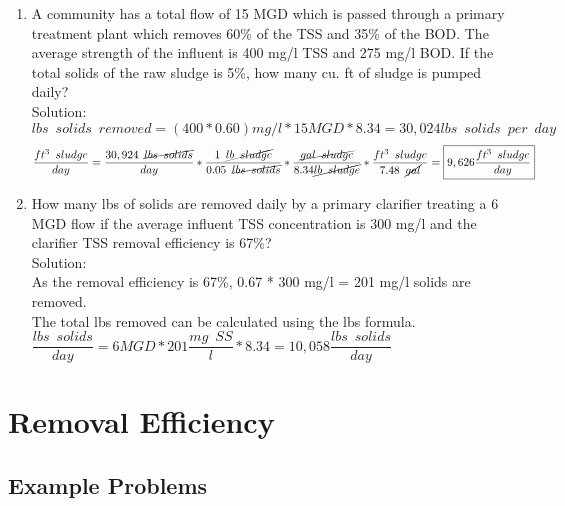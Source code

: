 \documentclass{article}
\begin{document}
\begin{enumerate}

\item A community has a total flow of 15 MGD which is passed through a primary treatment plant which removes 60\% of the TSS and 35\% of the BOD. The average strength of the influent is 400 mg/l TSS and 275 mg/l BOD. If the total solids of the raw sludge is 5\%, how many cu. ft of sludge is pumped daily?\\
Solution:\\
$lbs \enspace solids \enspace removed=(400*0.60)mg/l*15MGD*8.34=30,024lbs \enspace solids \enspace per \enspace day$
$$\dfrac{ft^3\enspace sludge}{day}= \dfrac{30,924 \enspace \cancel{lbs \enspace solids}}{day} * \dfrac{1 \enspace \cancel{lb \enspace sludge}}{0.05\enspace \cancel{lbs \enspace solids}}*\dfrac{\cancel{gal \enspace sludge}}{8.34\cancel{lb \enspace sludge}}*\dfrac{ft^3 \enspace sludge}{7.48 \enspace \cancel{gal}}=\boxed{9,626\dfrac{ft^3 \enspace sludge}{day}} $$

\item How many lbs of solids are removed daily by a primary clarifier treating a 6 MGD flow if the average influent TSS concentration is 300 mg/l and the clarifier TSS removal efficiency is 67\%?\\
Solution:\\
As the removal efficiency is 67\%, 0.67 * 300 mg/l = 201 mg/l solids are removed.\\
The total lbs removed can be calculated using the lbs formula.\\
$ \dfrac{lbs \enspace solids}{day}= 6 MGD* 201  \dfrac{mg \enspace  SS}{l}*8.34=\boxed{10,058 \dfrac{lbs \enspace solids}{day}}$
\end{enumerate}




















\section{Removal Efficiency}

\subsection{Example Problems} 
\end{document}
